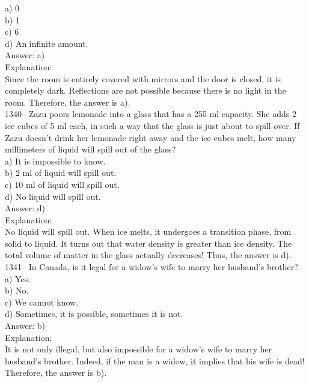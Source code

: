 \documentclass[letterpaper, 12pt]{article}
\begin{document}
a) 0\\
b) 1\\
c) 6\\
d) An infinite amount.\\

Answer: a)\\

Explanation: \\
Since the room is entirely covered with mirrors and the door is closed, it is completely dark. Reflections are not possible because there is no light in the room. Therefore, the answer is a).\\

1340-- Zazu poors lemonade into a glass that has a 255 ml capacity. She adds 2 ice cubes of 5 ml each, in such a way that the glass is just about to spill over. If Zazu doesn't drink her lemonade right away and the ice cubes melt, how many millimeters of liquid will spill out of the glass?\\

a) It is impossible to know.\\
b) 2 ml of liquid will spill out.\\
c) 10 ml of liquid will spill out.\\
d) No liquid will spill out.\\

Answer: d)\\

Explanation: \\
No liquid will spill out. When ice melts, it undergoes a transition phase, from solid to liquid. It turns out that water density is greater than ice density. The total volume of matter in the glass actually decreases! Thus, the answer is d).\\

1341-- In Canada, is it legal for a widow's wife to marry her husband's brother?\\
a) Yes.\\
b) No.\\
c) We cannot know.\\
d) Sometimes, it is possible, sometimes it is not.\\

Answer: b)\\

Explanation: \\
It is not only illegal, but also impossible for a widow's wife to marry her husband's brother. Indeed, if the man is a widow, it implies that his wife is dead! Therefore, the answer is b).\\
\end{document}
